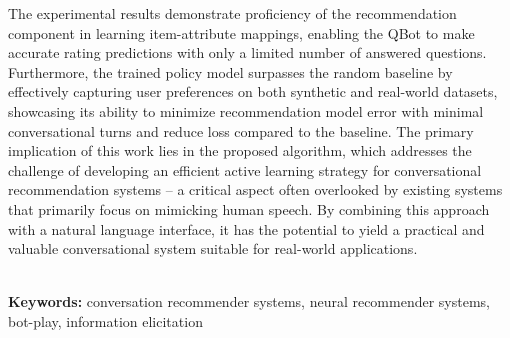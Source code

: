 The experimental results demonstrate proficiency of the recommendation component in learning item-attribute mappings, enabling the QBot to make accurate rating predictions with only a limited number of answered questions. Furthermore, the trained policy model surpasses the random baseline by effectively capturing user preferences on both synthetic and real-world datasets, showcasing its ability to minimize recommendation model error with minimal conversational turns and reduce loss compared to the baseline. The primary implication of this work lies in the proposed algorithm, which addresses the challenge of developing an efficient active learning strategy for conversational recommendation systems -- a critical aspect often overlooked by existing systems that primarily focus on mimicking human speech. By combining this approach with a natural language interface, it has the potential to yield a practical and valuable conversational system suitable for real-world applications.

~\\[1cm]
\noindent %
\textbf{Keywords:} conversation recommender systems, neural recommender systems, bot-play, information elicitation